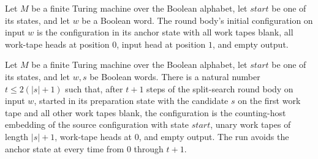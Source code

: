 \begin{lemma}
\label{Turing.FinTM.splitBody_start}
\leanok
{}
Let $M$ be a finite Turing machine over the Boolean alphabet, let $start$ be one of its
states, and let $w$ be a Boolean word. The round body's initial configuration on input
$w$ is the configuration in its anchor state with all work tapes blank, all work-tape
heads at position $0$, input head at position $1$, and empty output.
\end{lemma}

\begin{lemma}
\label{Turing.FinTM.splitBody_prepare}
\leanok
{}
Let $M$ be a finite Turing machine over the Boolean alphabet, let $start$ be one of its
states, and let $w,s$ be Boolean words. There is a natural number $t\le 2(|s|+1)$ such
that, after $t+1$ steps of the split-search round body on input $w$, started in its
preparation state with the candidate $s$ on the first work tape and all other work tapes
blank, the configuration is the counting-host embedding of the source configuration with
state $start$, unary work tapes of length $|s|+1$, work-tape heads at $0$, and empty
output. The run avoids the anchor state at every time from $0$ through $t+1$.
\end{lemma}


